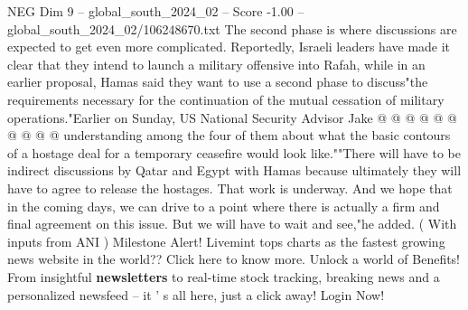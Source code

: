 \begin{textsample}{NEG Dim 9 – global\_south\_2024\_02 – Score -1.00 – global\_south\_2024\_02/106248670.txt}
The second phase is where discussions are expected to get even more complicated.
Reportedly, Israeli leaders have made it clear that they intend to launch a military offensive into Rafah, while in an earlier proposal, Hamas said they want to use a second phase to discuss"the requirements necessary for the continuation of the mutual cessation of military operations."Earlier on Sunday, US National Security Advisor Jake @ @ @ @ @ @ @ @ @ @ understanding among the four of them about what the basic contours of a hostage deal for a temporary ceasefire would look like.""There will have to be indirect discussions by Qatar and Egypt with Hamas because ultimately they will have to agree to release the hostages.
That work is underway.
And we hope that in the coming days, we can drive to a point where there is actually a firm and final agreement on this issue.
But we will have to wait and see,"he added. ( With inputs from ANI ) Milestone Alert!
Livemint tops charts as the fastest growing news website in the world??
Click here to know more.
Unlock a world of Benefits!
From insightful \textbf{newsletters} to real-time stock tracking, breaking news and a personalized newsfeed -- it ' s all here, just a click away!
Login Now!

\end{textsample}
